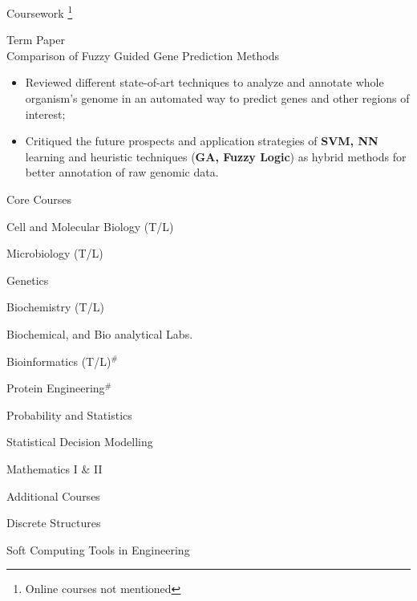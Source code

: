 \documentclass{article}
\newlength{\tabin}
\newlength{\secsep}
\newcommand{\lineunder}{\vspace*{-8pt} \\ \hspace*{-6pt} \hrulefill \\ \vspace*{-15pt}}
\newenvironment{tabbedsection}[1]{
  \begin{list}{}{
      \setlength{\itemsep}{0pt}
      \setlength{\labelsep}{0pt}
      \setlength{\labelwidth}{0pt}
      \setlength{\leftmargin}{\tabin}
      \setlength{\rightmargin}{\tabin}
      \setlength{\listparindent}{0pt}
      \setlength{\parsep}{0pt}
      \setlength{\parskip}{0pt}
      \setlength{\partopsep}{0pt}
      \setlength{\topsep}{#1}
    }
  \item[]
}{\end{list}}
\newenvironment{resume_section}[1]{
  \filbreak
  \vspace{2\secsep}
  \textsc{\large#1}
  \lineunder
  \begin{tabbedsection}{\secsep}
}{\end{tabbedsection}}
\newenvironment{resume_subsection}[2][]{
  \textbf{#2} \hfill {\footnotesize #1} \hspace*{-3.5em}
  \begin{tabbedsection}{0.5\secsep}
}{\end{tabbedsection}}
\newenvironment{subitems}{
  \renewcommand{\labelitemi}{$\cdot$}
  \begin{itemize}
      \setlength{\labelsep}{1em}
}{\end{itemize}}
\begin{document}
\begin{resume_section}{Coursework \footnote{Online courses not mentioned}}

  \begin{resume_subsection}{Term Paper \\ Comparison of Fuzzy Guided Gene Prediction Methods}
    \begin{subitems}
      \item Reviewed different state-of-art techniques to analyze and annotate whole organism's genome in an automated way to predict genes and other regions of interest;
      \item Critiqued the future prospects and application strategies of \textbf{SVM, NN} learning and heuristic techniques (\textbf{GA, Fuzzy Logic}) as hybrid methods for better annotation of raw genomic data.\\
    \end{subitems}
    \end{resume_subsection}
    
\begin{resume_subsection}{Core Courses}
\vspace*{-8pt}
    \begin{subitems}
        \begin{multicols}{2}
        \item Cell and Molecular Biology (T/L)
        \item Microbiology (T/L)
        \item Genetics
        \item Biochemistry (T/L)
        \item Biochemical, and Bio analytical Labs.
        \item Bioinformatics (T/L)$^{\#}$
        \item Protein Engineering$^{\#}$
        \item Probability and Statistics
        \item Statistical Decision Modelling
        \item Mathematics I \& II
        \end{multicols}
    \end{subitems}
\end{resume_subsection}

\begin{resume_subsection}{Additional Courses}
\vspace*{-8pt}
    \begin{subitems}
        \begin{multicols}{2}
        \item Discrete Structures
        \item Soft Computing Tools in Engineering
        \end{multicols}
    \end{subitems}
\end{resume_subsection}

\end{resume_section}
\end{document}
